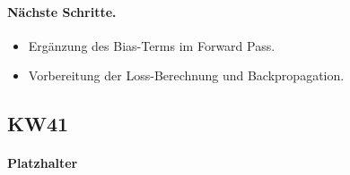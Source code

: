 \paragraph{Nächste Schritte.}
\begin{itemize}
    \item Ergänzung des Bias-Terms im Forward Pass.
    \item Vorbereitung der Loss-Berechnung und Backpropagation.
\end{itemize}

\subsection{KW41}

\paragraph{Platzhalter}

\newpage